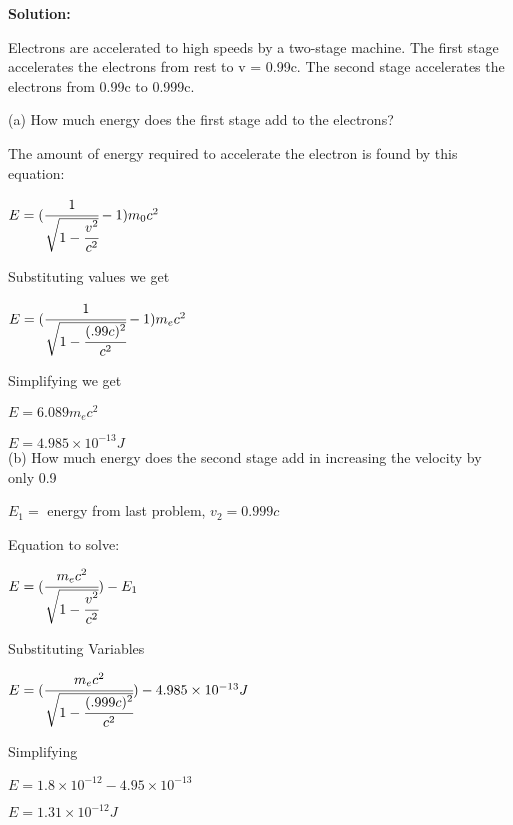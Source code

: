 \documentclass{article}
\begin{document}
\textbf{Solution:}

Electrons are accelerated to high speeds by a two-stage
machine. The first stage accelerates the electrons from rest
to v = 0.99c. The second stage accelerates the electrons
from 0.99c to 0.999c.

(a) How much energy does the first stage add to the electrons?


The amount of energy required to accelerate the electron is found by this equation:

$E = (\cfrac{1}{\sqrt{1 - \cfrac{v^2}{c^2}}} - 1)m_0c^2$

Substituting values we get

$E = (\cfrac{1}{\sqrt{1 - \cfrac{(.99c)^2}{c^2}}} - 1)m_ec^2$

Simplifying we get

$E = 6.089m_ec^2$

$ E = 4.985 \times 10^{-13} J$ \\[1em]



(b) How much energy does the second stage add in increasing the velocity by only 0.9

$ E_1 = $ energy from last problem, $v_2 = 0.999c$

Equation to solve:

$E = (\cfrac{m_ec^2}{\sqrt{1 - \cfrac{v^2}{c^2}}}) - E_1$

Substituting Variables

$E = (\cfrac{m_ec^2}{\sqrt{1 - \cfrac{(.999c)^2}{c^2}}}) - 4.985 \times 10^{-13} J$

Simplifying

$E = 1.8 \times 10^{-12} - 4.95 \times 10^{-13} $

$E = 1.31 \times 10^{-12} J$
\end{document}
